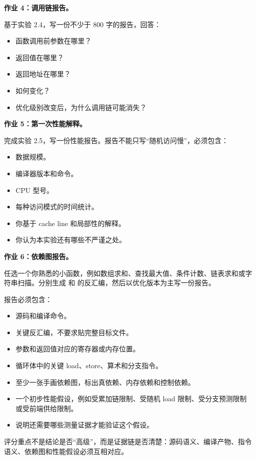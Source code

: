 \begin{exercisebox}
\textbf{作业 4：调用链报告。}

基于实验 2.4，写一份不少于 800 字的报告，回答：

\begin{itemize}
  \item 函数调用前参数在哪里？
  \item 返回值在哪里？
  \item 返回地址在哪里？
  \item {} 如何变化？
  \item 优化级别改变后，为什么调用链可能消失？
\end{itemize}
\end{exercisebox}

\begin{exercisebox}
\textbf{作业 5：第一次性能解释。}

完成实验 2.5，写一份性能报告。报告不能只写``随机访问慢''，必须包含：

\begin{itemize}
  \item 数据规模。
  \item 编译器版本和命令。
  \item CPU 型号。
  \item 每种访问模式的时间统计。
  \item 你基于 cache line 和局部性的解释。
  \item 你认为本实验还有哪些不严谨之处。
\end{itemize}
\end{exercisebox}

\begin{exercisebox}
\textbf{作业 6：依赖图报告。}

任选一个你熟悉的小函数，例如数组求和、查找最大值、条件计数、链表求和或字符串扫描。分别生成  和  的反汇编，然后以优化版本为主写一份报告。

报告必须包含：

\begin{itemize}
  \item 源码和编译命令。
  \item 关键反汇编，不要求贴完整目标文件。
  \item 参数和返回值对应的寄存器或内存位置。
  \item 循环体中的关键 load、store、算术和分支指令。
  \item 至少一张手画依赖图，标出真依赖、内存依赖和控制依赖。
  \item 一个初步性能假设，例如受累加链限制、受随机 load 限制、受分支预测限制或受前端供给限制。
  \item 说明还需要哪些测量证据才能验证这个假设。
\end{itemize}

评分重点不是结论是否“高级”，而是证据链是否清楚：源码语义、编译产物、指令语义、依赖图和性能假设必须互相对应。
\end{exercisebox}

